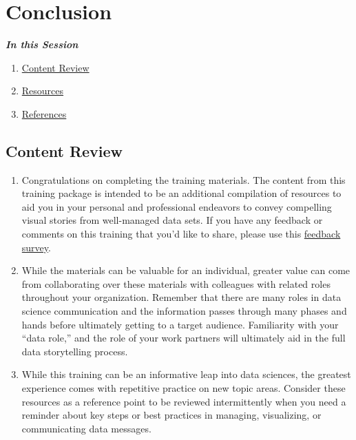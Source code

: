 \documentclass[
]{book}
\providecommand{\tightlist}{%
  \setlength{\itemsep}{0pt}\setlength{\parskip}{0pt}}
\begin{document}
\hypertarget{conclusion}{%
\chapter{Conclusion}\label{conclusion}}

\textbf{\emph{In this Session}}

\begin{enumerate}
\def\labelenumi{\arabic{enumi}.}
\tightlist
\item
  \protect\hyperlink{content-review}{Content Review}
\item
  \protect\hyperlink{resources}{Resources}
\item
  \protect\hyperlink{references}{References}
\end{enumerate}

\hypertarget{content-review}{%
\section{Content Review}\label{content-review}}

\begin{enumerate}
\def\labelenumi{\arabic{enumi}.}
\tightlist
\item
  Congratulations on completing the training materials. The content from this training package is intended to be an additional compilation of resources to aid you in your personal and professional endeavors to convey compelling visual stories from well-managed data sets. If you have any feedback or comments on this training that you'd like to share, please use this \href{https://docs.google.com/forms/d/e/1FAIpQLScWOoeHmA3YpyKbfKFeTNPSyaxCJfK6R2-oNPK-APcwuaLOdQ/viewform?usp=sf_link}{feedback survey}.
\item
  While the materials can be valuable for an individual, greater value can come from collaborating over these materials with colleagues with related roles throughout your organization. Remember that there are many roles in data science communication and the information passes through many phases and hands before ultimately getting to a target audience. Familiarity with your ``data role,'' and the role of your work partners will ultimately aid in the full data storytelling process.
\item
  While this training can be an informative leap into data sciences, the greatest experience comes with repetitive practice on new topic areas. Consider these resources as a reference point to be reviewed intermittently when you need a reminder about key steps or best practices in managing, visualizing, or communicating data messages.
\end{enumerate}
\end{document}
